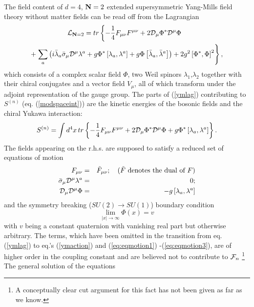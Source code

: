 \documentclass[a4paper,12pt]{article}
\begin{document}
The field content of $d=4$, ${\bf N}=2$ extended supersymmetric 
Yang-Mills field theory without matter fields can be read off 
from the Lagrangian
\begin{eqnarray}
{\cal L}_{{\bf N}=2}=tr \left\{-\frac{1}{4} F_{\mu \nu}F^{\mu \nu} 
+2{\cal D}_{\mu} \Phi^* {\cal D}^{\mu}\Phi 
\right.\qquad \qquad \qquad  \nonumber \\
+\left.\sum_{a}\left(i\bar{\lambda}_a \bar{\sigma}_{\mu} 
{\cal D}^{\mu} \lambda^a 
+g\Phi^* \left[\lambda_a ,\lambda^a \right]+g\Phi \left[\bar{\lambda}_a,
\bar{\lambda}^a\right]\right) +2g^2\left[\Phi^*, 
\Phi\right]^2\right\},
\label{ymlag}
\end{eqnarray}
which consists of a complex scalar field $\Phi$, two Weil 
spinors $\lambda_1$,$\lambda_2$ together with their chiral 
conjugates and a vector field $V_{\mu}$, all of which transform 
under the adjoint representation of the gauge group. 
The parts of (\ref{ymlag}) contributing to $S^{(n)}$ 
(eq. (\ref{modspaceint})) are the kinetic energies of the 
bosonic fields and the chiral Yukawa interaction: 
\begin{eqnarray}
S^{(n)}=\int d^4 x \,tr \left\{-\frac{1}{4} F_{\mu \nu}F^{\mu \nu}
+2{\cal D}_{\mu} \Phi^* {\cal D}^{\mu}\Phi +  
g\Phi^* \left[\lambda_a ,\lambda^a \right]\right\}.
\label{ymaction}
\end{eqnarray}  
The fields appearing on the r.h.s. are supposed to satisfy 
a reduced set of equations of motion
\begin{eqnarray}
\label{eq:eqmotion1}
F_{\mu \nu}&=&\tilde{F}_{\mu \nu}; \quad   
\mbox{($\tilde{F}$ denotes the dual of $F$)} \\
\label{eq:eqmotion2}
\bar{\sigma}_{\mu} 
{\cal D}^{\mu} \lambda^a &=&0;  \\
\label{eq:eqmotion3}
{\cal D}_{\mu}{\cal D}^{\mu} \Phi &=&- g \left[ \lambda_a ,\lambda^a \right]
\end{eqnarray}
and the symmetry breaking ($SU(2) \rightarrow SU(1)$) boundary 
condition  
\begin{equation}
\lim_{|x|\rightarrow \infty} \Phi (x)=v 
\label{vev}
\end{equation} 
with $v$ being a constant quaternion with vanishing real part but 
otherwise arbitrary. The terms, which have been omitted in the 
transition from eq. (\ref{ymlag}) to eq.'s (\ref{ymaction}) and  
(\ref{eq:eqmotion1}) -(\ref{eq:eqmotion3}), are of higher order 
in the coupling constant 
and are believed not to contribute to ${\cal F}_n$ \footnote{
A conceptually clear cut 
argument for this fact has not been given as far as 
we know.} The general solution of the equations 
\end{document}
